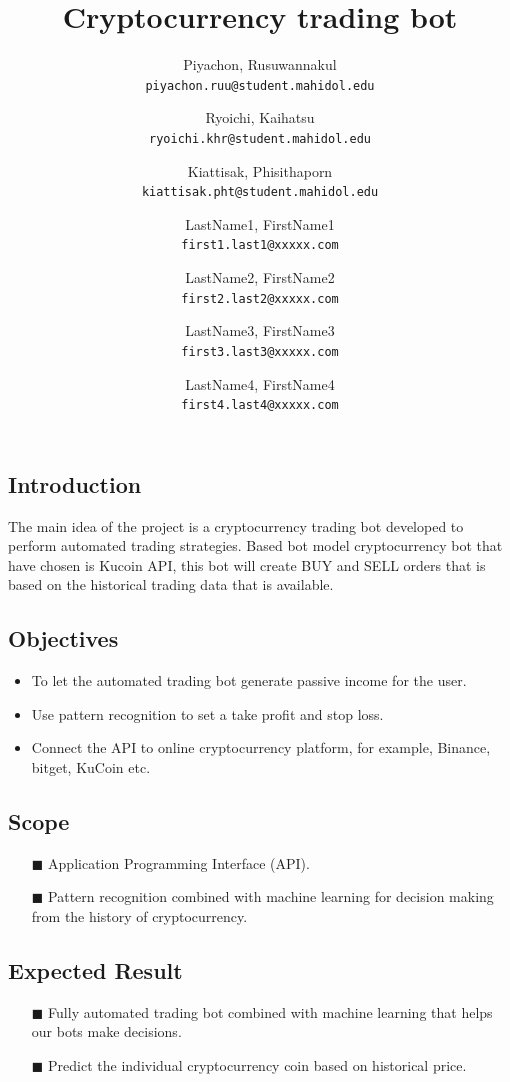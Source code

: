 \documentclass[a4paper]{article}
\title{Cryptocurrency trading bot}
\author{
	Piyachon, Rusuwannakul\\
	\texttt{piyachon.ruu@student.mahidol.edu}
	\and
	Ryoichi, Kaihatsu\\
	\texttt{ryoichi.khr@student.mahidol.edu} 
	\and
	Kiattisak, Phisithaporn\\
	\texttt{kiattisak.pht@student.mahidol.edu}
}
\author{
		LastName1, FirstName1\\
		\texttt{first1.last1@xxxxx.com} 
		
		
		\and
		LastName2, FirstName2\\
		\texttt{first2.last2@xxxxx.com}
		\and
		LastName3, FirstName3\\
		\texttt{first3.last3@xxxxx.com}
		\and
		LastName4, FirstName4\\
		\texttt{first4.l\add{\alert{\alert{text}}}ast4@xxxxx.com}
	}
\begin{document}
\maketitle
\subsection{Introduction}
The main idea of the project is a cryptocurrency trading bot developed to perform automated trading strategies. Based bot model cryptocurrency bot that have chosen is Kucoin API, this bot will create BUY and SELL orders that is based on the historical trading data that is available. 
\subsection{Objectives}
\begin{itemize}
	\item To let the automated trading bot generate passive income for the user.
	\item Use pattern recognition to set a take profit and stop loss.
	\item Connect the API to online cryptocurrency platform, for example, Binance, bitget, KuCoin etc.
\end{itemize}

\subsection{Scope}
\begin{itemize}
	\item[$\blacksquare$] Application Programming Interface (API).
	\item[$\blacksquare$] Pattern recognition combined with machine learning for decision making from the history of cryptocurrency.
\end{itemize}

\subsection{Expected Result}
\begin{itemize}
	\item[$\blacksquare$] Fully automated trading bot combined with machine learning that helps our bots make decisions.
	\item[$\blacksquare$] Predict the individual cryptocurrency coin based on historical price. 
	
\end{itemize}
\end{document}
